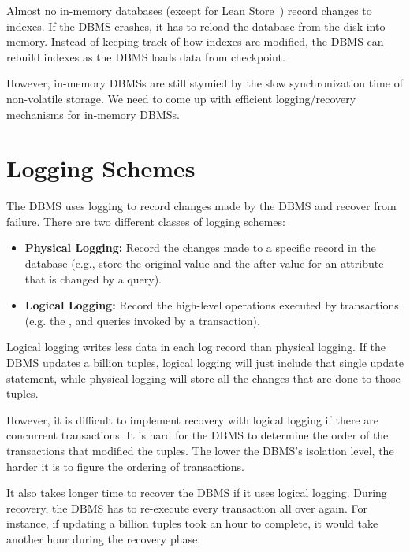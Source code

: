 \documentclass[11pt]{article}
\begin{document}
Almost no in-memory databases (except for Lean Store~\cite{8509247}) record changes to indexes. If the DBMS crashes, it has to reload the database from the disk into memory. Instead of keeping track of how indexes are modified, the DBMS can rebuild indexes as the DBMS loads data from checkpoint.

However, in-memory DBMSs are still stymied by the slow synchronization time of non-volatile storage. We need to come up with efficient logging/recovery mechanisms for in-memory DBMSs.

\section{Logging Schemes}
The DBMS uses logging to record changes made by the DBMS and recover from failure. There are two different classes of logging schemes: 
\begin{itemize}
    \item \textbf{Physical Logging:} Record the changes made to a specific record in the database (e.g., store the original value and the after value for an attribute that is changed by a query).
    \item \textbf{Logical Logging:} Record the high-level operations executed by transactions (e.g. the ,  and  queries invoked by a transaction).
\end{itemize}

Logical logging writes less data in each log record than physical logging. If the DBMS updates a billion tuples, logical logging will just include that single update statement, while physical logging will store all the changes that are done to those tuples.

However, it is difficult to implement recovery with logical logging if there are concurrent transactions. It is hard for the DBMS to determine the order of the transactions that modified the tuples. The lower the DBMS's isolation level, the harder it is to figure the ordering of transactions.

It also takes longer time to recover the DBMS if it uses logical logging. During recovery, the DBMS has to re-execute every transaction all over again. For instance, if updating a billion tuples took an hour to complete, it would take another hour during the recovery phase.
\end{document}
